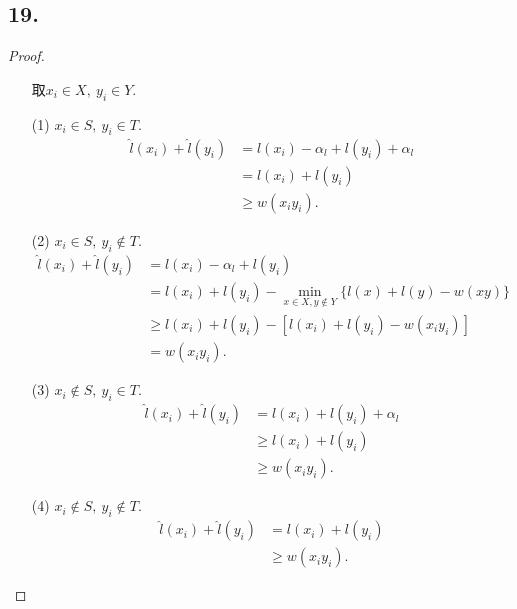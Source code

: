 \documentclass{article}
\begin{document}
\subsection*{19.}
\begin{proof}
    \begin{enumerate}
        \item []取$x_i\in X,\ y_i\in Y$.
        \item [(1)]$x_i\in S,\ y_i\in T$.
        \begin{align*}
            \widehat{l}(x_i)+\widehat{l}(y_i)
            &= l(x_i)-\alpha_l+l(y_i)+\alpha_l\\
            &= l(x_i)+l(y_i)\\
            &\geq w(x_i y_i).
        \end{align*}

        \item [(2)]$x_i\in S,\ y_i\notin T$.
        \begin{align*}
            \widehat{l}(x_i)+\widehat{l}(y_i)
            &= l(x_i)-\alpha_l +l(y_i)\\
            &= l(x_i)+l(y_i)- \min\limits_{x\in X,y\notin Y} \{l(x)+l(y)-w(xy) \}\\
            &\geq l(x_i)+l(y_i)- \left[l(x_i)+l(y_i)-w(x_i y_i) \right] \\
            &=w(x_i y_i).
        \end{align*}

        \item [(3)]$x_i\notin S,\ y_i\in T$.
        \begin{align*}
            \widehat{l}(x_i)+\widehat{l}(y_i)
            &= l(x_i)+l(y_i)+\alpha_{l} \\
            &\geq l(x_i)+l(y_i)\\
            &\geq w(x_i y_i).
        \end{align*}

        \item [(4)]$x_i\notin S,\ y_i\notin T$.
        \begin{align*}
            \widehat{l}(x_i)+\widehat{l}(y_i)
            &= l(x_i)+l(y_i)\\
            &\geq w(x_i y_i).
        \end{align*}
    \end{enumerate}
\end{proof}
\end{document}
